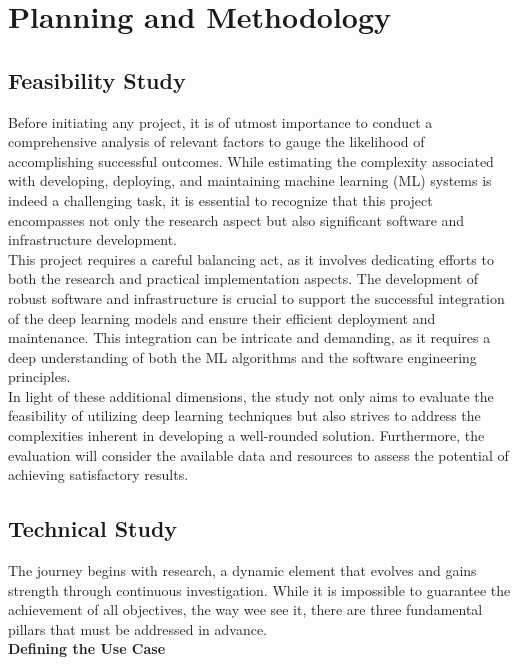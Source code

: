 \chapter{Planning and Methodology}
\label{cap:plan}

\section{Feasibility Study}

Before initiating any project, it is of utmost importance to conduct a comprehensive analysis of relevant factors to gauge the likelihood of accomplishing successful outcomes. While estimating the complexity associated with developing, deploying, and maintaining machine learning (ML) systems is indeed a challenging task, it is essential to recognize that this project encompasses not only the research aspect but also significant software and infrastructure development. \\

This project requires a careful balancing act, as it involves dedicating efforts to both the research and practical implementation aspects. The development of robust software and infrastructure is crucial to support the successful integration of the deep learning models and ensure their efficient deployment and maintenance. This integration can be intricate and demanding, as it requires a deep understanding of both the ML algorithms and the software engineering principles. \\

In light of these additional dimensions, the study not only aims to evaluate the feasibility of utilizing deep learning techniques but also strives to address the complexities inherent in developing a well-rounded solution. Furthermore, the evaluation will consider the available data and resources to assess the potential of achieving satisfactory results.

\section{Technical Study}

The journey begins with research, a dynamic element that evolves and gains strength through continuous investigation. While it is impossible to guarantee the achievement of all objectives, the way wee see it, there are three fundamental pillars that must be addressed in advance. \\

\vspace{0.5cm}
\textbf{Defining the Use Case} \\

